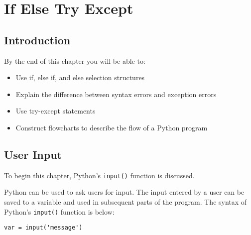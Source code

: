 \documentclass{book}
\newcommand{\passthrough}[1]{#1}
\begin{document}
    
        \hypertarget{if-else-try-except}{%
\chapter{If Else Try Except}\label{if-else-try-except}}
    




    
        \hypertarget{introduction}{%
\section{Introduction}\label{introduction}}
    




    
        By the end of this chapter you will be able to:

\begin{itemize}
\item
  Use if, else if, and else selection structures
\item
  Explain the difference between syntax errors and exception errors
\item
  Use try-except statements
\item
  Construct flowcharts to describe the flow of a Python program
\end{itemize}
        \newpage

    




    
        \hypertarget{user-input}{%
\section{User Input}\label{user-input}}
    




    
        To begin this chapter, Python's \passthrough{\lstinline!input()!}
function is discussed.
    




    
        Python can be used to ask users for input. The input entered by a user
can be saved to a variable and used in subsequent parts of the program.
The syntax of Python's \passthrough{\lstinline!input()!} function is
below:

\begin{lstlisting}
var = input('message')
\end{lstlisting}
\end{document}
